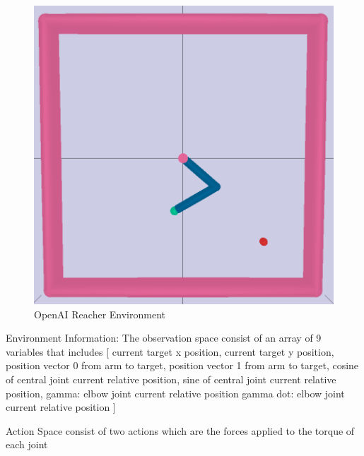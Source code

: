\begin{figure}[h!]
    \begin{center}
            \includegraphics[width=.5\linewidth]{figures/envs/openai_reacher.png}
            \caption{OpenAI Reacher Environment}
            \label{fig:openai_reacher}
    \end{center}
\end{figure}

Environment Information:
The observation space consist of an array of 9 variables that includes [
    current target x position, 
    current target y position, 
    position vector 0 from arm to target,
    position vector 1 from arm to target,
    cosine of central joint current relative position,
    sine of central joint current relative position,
    gamma: elbow joint current relative position
    gamma dot: elbow joint current relative position
]

Action Space consist of two actions which are the forces applied to the torque of each joint